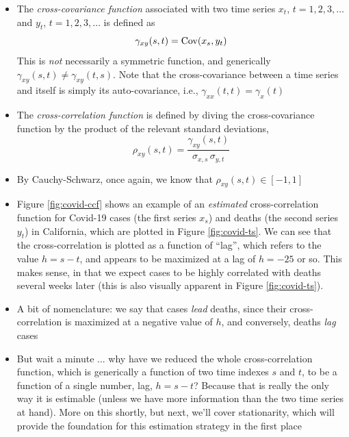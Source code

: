 \documentclass{article}
\begin{document}
\begin{itemize}
\item The \emph{cross-covariance function} associated with two time series $x_t$, 
  $t = 1,2,3,\dots$ and $y_t$, $t = 1,2,3,\dots$ is defined as
  \[
  \gamma_{xy}(s,t) = \operatorname{Cov}(x_s, y_t)
  \]
  This is \emph{not} necessarily a symmetric function, and generically
  $\gamma_{xy}(s,t) \not= \gamma_{xy}(t,s)$. Note that the cross-covariance
  between a time series and itself is simply its auto-covariance, i.e.,
  $\gamma_{xx}(t,t) = \gamma_x(t)$

\item The \emph{cross-correlation function} is defined by diving the
  cross-covariance function by the product of the relevant standard deviations, 
  \[
  \rho_{xy}(s,t) = \frac{\gamma_{xy}(s,t)}{\sigma_{x,s} \, \sigma_{y,t}}
  \]

\item By Cauchy-Schwarz, once again, we know that $\rho_{xy}(s,t) \in [-1,1]$ 

\item Figure \ref{fig:covid-ccf} shows an example of an \emph{estimated} 
  cross-correlation function for Covid-19 cases (the first series $x_s$) and 
  deaths (the second series $y_t$) in California, which are plotted in Figure
  \ref{fig:covid-ts}. We can see that the cross-correlation is plotted as a
  function of ``lag'', which refers to the value $h = s-t$, and appears to be  
  maximized at a lag of $h = -25$ or so. This makes sense, in that we expect
  cases to be highly correlated with deaths several weeks later (this is also
  visually apparent in Figure \ref{fig:covid-ts}). 

\item A bit of nomenclature: we say that cases \emph{lead} deaths, since their
  cross-correlation is maximized at a negative value of $h$, and conversely, 
  deaths \emph{lag} cases  

\item  But wait a minute ... why have we reduced the whole cross-correlation 
  function, which is generically a function of two time indexes $s$ and $t$, to
  be a function of a single number, lag, $h = s-t$? Because that is really the
  only way it is estimable (unless we have more information than the two time
  series at hand). More on this shortly, but next, we'll cover stationarity,
  which will provide the foundation for this estimation strategy in the first
  place 
\end{itemize}
\end{document}
